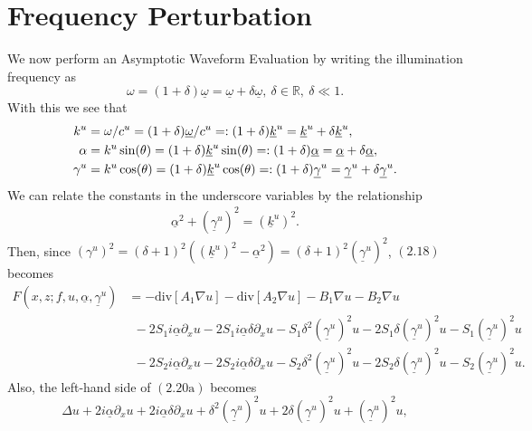 \section{Frequency Perturbation}
\label{intro:frequency_perturbation}
We now perform an Asymptotic Waveform Evaluation by writing the illumination frequency as 
\begin{equation}\omega=(1+\delta)\underline{\omega}=\underline{\omega}+\delta\underline{\omega},~\delta\in\mathbb R, ~ \delta \ll 1.\end{equation}
With this we see that
\begin{subequations}
\begin{align} 
k^u & = \omega/c^u = (1 + \delta) \underline{\omega}/c^u 
  =: (1 + \delta) \underline{k}^u = \underline{k}^u + \delta \underline{k}^u,\\
\alpha & = k^u \sin(\theta) = (1 + \delta) \underline{k}^u \sin(\theta)
  =: (1 + \delta) \underline{\alpha} = \underline{\alpha} + \delta \underline{\alpha},\\
\gamma^u & = k^u \cos(\theta) = (1 + \delta) \underline{k}^u \cos(\theta)
  =: (1 + \delta) \underline{\gamma}^u = \underline{\gamma}^u + \delta \underline{\gamma}^u.
\end{align}
\end{subequations}
We can relate the constants in the underscore variables by the relationship
\begin{align}\underline{\alpha}^2 + (\underline{\gamma}^u)^2 = (\underline{k}^u)^2.
\end{align}
Then, since $({\gamma}^u)^2=(\delta+1)^2\left((\underline{k}^u)^2-\underline{\alpha}^2\right)=(\delta+1)^2(\underline{\gamma}^u)^2$, $(2.18)$ becomes
\begin{align*}F\left(x,z;f,u,\underline{\alpha},\underline{\gamma}^u\right)&=-\text{div}[A_1\nabla u]-\text{div}[A_2\nabla u]-B_1\nabla u - B_2\nabla u\nonumber \\&~~-2S_1i\underline{\alpha}\partial_xu-2S_1i\underline{\alpha}\delta\partial_xu-S_1\delta^2(\underline{\gamma}^u)^2u-2S_1\delta(\underline{\gamma}^u)^2u-S_1(\underline{\gamma}^u)^2u\nonumber
\\&~~-2S_2i\underline{\alpha}\partial_xu-2S_2i\underline{\alpha}\delta\partial_xu-S_2\delta^2(\underline{\gamma}^u)^2u-2S_2\delta(\underline{\gamma}^u)^2u-S_2(\underline{\gamma}^u)^2u.
\end{align*}
Also, the left-hand side of $(2.20\text{a})$ becomes
\begin{equation*}\Delta u +2i\underline{\alpha}\partial_xu+2i\underline{\alpha}\delta\partial_xu+\delta^2(\underline{\gamma}^u)^2u+2\delta(\underline{\gamma}^u)^2u+(\underline{\gamma}^u)^2u,\end{equation*}
